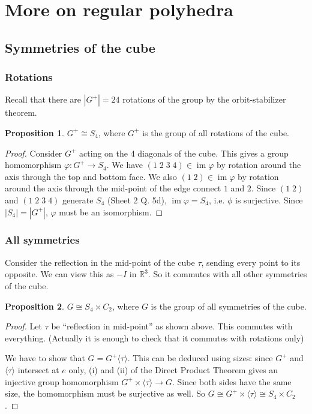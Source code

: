 \documentclass[a4paper]{article}
\theoremstyle{definition}
\newtheorem*{prop}{Proposition}
\newcommand{\R}{\mathbb{R}}
\newcommand{\bra}{\langle}
\newcommand{\ket}{\rangle}
\let\stdsection\section
\renewcommand\section{\newpage\stdsection}
\DeclareMathOperator\im{im}
\begin{document}
\section{More on regular polyhedra}
\subsection{Symmetries of the cube}
\subsubsection{Rotations}
Recall that there are $|G^+| = 24$ rotations of the group by the orbit-stabilizer theorem.
\begin{prop}
  $G^+ \cong S_4$, where $G^+$ is the group of all rotations of the cube.
\end{prop}

\begin{proof}
Consider $G^+$ acting on the 4 diagonals of the cube. This gives a group homomorphism $\varphi: G^+ \to S_4$. We have $(1\; 2\; 3\; 4)\in\im \varphi$ by rotation around the axis through the top and bottom face. We also $(1\; 2)\in \im \varphi$ by rotation around the axis through the mid-point of the edge connect $1$ and $2$. Since $(1\; 2)$ and $(1\; 2\; 3\; 4)$ generate $S_4$ (Sheet 2 Q. 5d), $\im\varphi = S_4$, i.e. $\phi$ is surjective. Since $|S_4| = |G^+|$, $\varphi$ must be an isomorphism.
\end{proof}

\subsubsection{All symmetries}
Consider the reflection in the mid-point of the cube $\tau$, sending every point to its opposite. We can view this as $-I$ in $\R^3$. So it commutes with all other symmetries of the cube.
\begin{prop}
  $G \cong S_4\times C_2$, where $G$ is the group of all symmetries of the cube.
\end{prop}

\begin{proof}
  Let $\tau$ be ``reflection in mid-point'' as shown above. This commutes with everything. (Actually it is enough to check that it commutes with rotations only)

  We have to show that $G = G^+\bra \tau\ket$. This can be deduced using sizes: since $G^+$ and $\bra\tau\ket$ intersect at $e$ only, (i) and (ii) of the Direct Product Theorem gives an injective group homomorphism $G^+\times \bra\tau\ket \to G$. Since both sides have the same size, the homomorphism must be surjective as well. So $G\cong G^+\times \bra \tau\ket \cong S_4\times C_2$. 
\end{proof}
\end{document}
